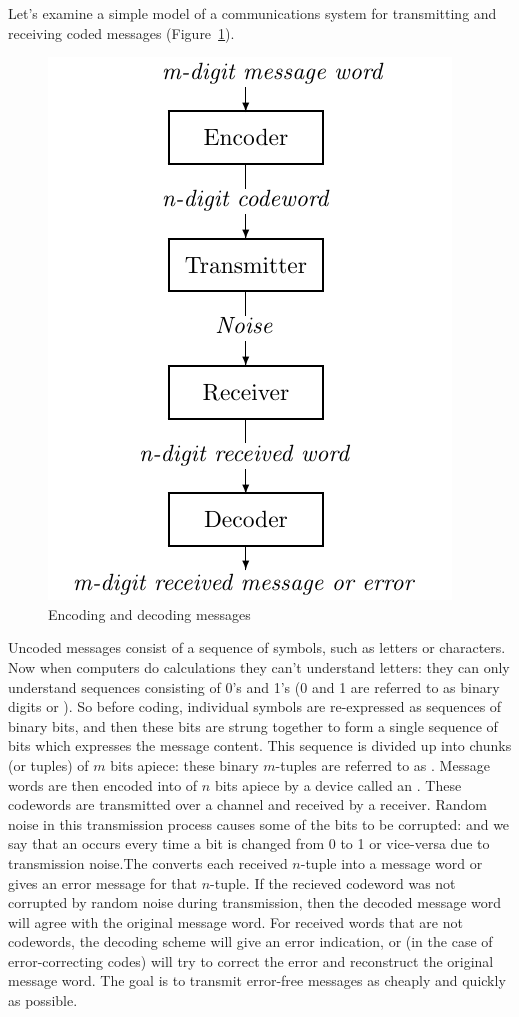 Let's examine a simple model of a communications system for
transmitting and receiving coded messages (Figure~\ref{encoding}).  
\begin{figure}[htbp]
\begin{center}
\includegraphics{images/simpleCommModel.png}
\end{center}
\caption{Encoding and decoding messages\label{encoding}}
\end{figure}
Uncoded messages consist of a sequence of symbols, such as letters or characters. Now when computers do calculations they can't understand letters: they can only understand sequences consisting of 0's and 1's (0 and 1 are referred to as binary digits or ).  So before coding, individual symbols are  re-expressed as sequences of binary bits, and then these bits are strung together to form a single sequence of bits which expresses the message content.  This sequence is divided up into chunks (or tuples) of $m$ bits apiece: these binary $m$-tuples
are referred to as . Message words are
then encoded into  of $n$ bits apiece by a device
called an . These codewords are transmitted over a channel and received by a receiver.
Random noise in this transmission process causes some of the bits to be corrupted: and we say that 
 an  occurs every time a bit is changed from 0 to 1 or vice-versa due to transmission noise.The  converts
each received $n$-tuple into a message word or
gives an error message for that $n$-tuple. If the recieved codeword was not corrupted by random noise during transmission,
then the decoded message word will agree with the original message word. For received words that are not codewords, the decoding scheme will
give an error indication, or (in the case of error-correcting codes) will try
to correct the error and reconstruct the original message word. The  goal is
to transmit error-free messages as cheaply and quickly as possible.

